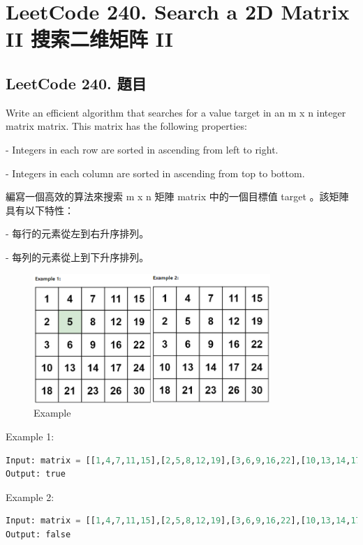 \documentclass[10pt,UTF8]{ctexart}
\begin{document}
\newpage

\section{LeetCode 240. Search a 2D Matrix II 搜索二维矩阵 II}

\subsection{LeetCode 240. 題目}


Write an efficient algorithm that searches for a value target in an m x n integer matrix matrix. This matrix has the following properties:

- Integers in each row are sorted in ascending from left to right.

- Integers in each column are sorted in ascending from top to bottom.

編寫一個高效的算法來搜索 m x n 矩陣 matrix 中的一個目標值 target 。該矩陣具有以下特性：

- 每行的元素從左到右升序排列。

- 每列的元素從上到下升序排列。

\begin{figure}[H]
\centering 
\includegraphics[width=0.80\textwidth]{lc-240-p-example.png} 
\caption{Example}
\label{Test}
\end{figure}

Example 1:

\begin{lstlisting}[language={python}]
Input: matrix = [[1,4,7,11,15],[2,5,8,12,19],[3,6,9,16,22],[10,13,14,17,24],[18,21,23,26,30]], target = 5
Output: true
\end{lstlisting}


Example 2:

\begin{lstlisting}[language={python}]
Input: matrix = [[1,4,7,11,15],[2,5,8,12,19],[3,6,9,16,22],[10,13,14,17,24],[18,21,23,26,30]], target = 20
Output: false
\end{lstlisting}
\end{document}
